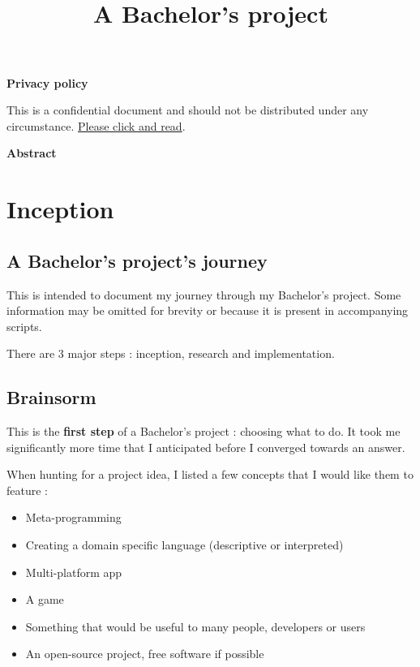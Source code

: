 \documentclass[11pt]{article}
\title{\vspace{15mm}{\HUGE PoGER}\\
	A Bachelor's project}
\author{}
\date{}
\begin{document}
\maketitle

\vspace{90mm}

\textbf{Privacy policy}

This is a confidential document and should not be distributed under any circumstance. \hyperref[sec:privacypolice]{Please click and read}.

\textbf{Abstract}

\lipsum[2-3]


\newpage

\begingroup
\hypersetup{linkcolor=black}
\tableofcontents
\endgroup

\newpage
\section{Inception}

\subsection{A Bachelor's project's journey}

This is intended to document my journey through my Bachelor's project. Some information may be omitted for brevity or because it is present in accompanying scripts.

There are 3 major steps : inception, research and implementation.

\subsection{Brainsorm}

This is the \textbf{first step} of a Bachelor's project : choosing what to do. It took me significantly more time that I anticipated before I converged towards an answer.

When hunting for a project idea, I listed a few concepts that I would like them to feature :
\begin{itemize}
	\item Meta-programming
	\item Creating a domain specific language (descriptive or interpreted)
	\item Multi-platform app
	\item A game
	\item Something that would be useful to many people, developers or users
	\item An open-source project, free software if possible
\end{itemize}
\end{document}
